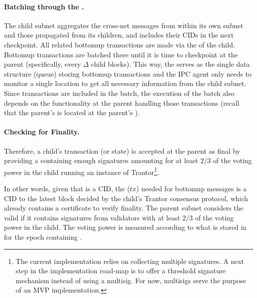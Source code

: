 \paragraph{Batching through the \gw.} The child subnet aggregates the cross-net messages from within its own subnet and those propagated from its children, and includes their CIDs in the next checkpoint. All related bottomup transactions are made via the \gw of the child. Bottomup transactions are batched there until it is time to checkpoint at the parent (specifically, every $\Delta$ child blocks). This way, the \gw serves as the single data structure (queue) storing bottomup transactions and the IPC agent only needs to monitor a single location to get all necessary information from the child subnet. Since \postoffice transactions are included in the batch, the execution of the batch also depends on the \postoffice functionality at the parent handling those transactions (recall that the parent's \postoffice is located at the parent's  \gw).

 \paragraph{Checking for Finality.}
Therefore, a child's transaction (or state) \tx is accepted at the parent as final by providing a \prf containing enough signatures amounting for at least $2/3$ of the voting power in the child running an instance of Trantor\footnote{The current implementation relies on collecting multiple signatures. A next step in the implementation road-map is to offer a threshold signature mechanism instead of using a multisig. For now, multisigs serve the purpose of an MVP implementation.}.
 
 In other words, given that \tx is a CID, the \prf($tx$) needed for bottomup messages is a CID to the latest block decided by the child's Trantor consensus protocol, which already contains a certificate to verify finality. The parent subnet considers the \prf valid if it contains signatures from validators with at least $2/3$ of the voting power in the child. The voting power is measured according to what is stored in \sa for the epoch containing \tx. 


